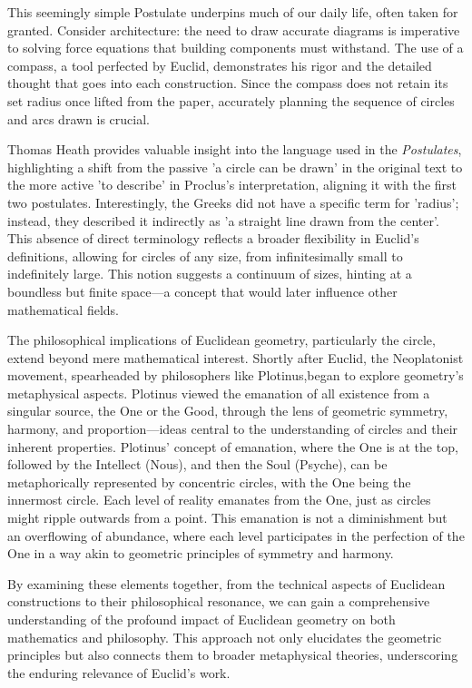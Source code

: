 This seemingly simple Postulate underpins much of our daily life, often taken for granted. Consider architecture: the need to draw accurate diagrams is imperative to solving force equations that building components must withstand. The use of a compass, a tool perfected by Euclid, demonstrates his rigor and the detailed thought that goes into each construction. Since the compass does not retain its set radius once lifted from the paper, accurately planning the sequence of circles and arcs drawn is crucial.

\clearpage

Thomas Heath provides valuable insight into the language used in the \textit{Postulates}, highlighting a shift from the passive 'a circle can be drawn' in the original text to the more active 'to describe' in Proclus's interpretation, aligning it with the first two postulates. Interestingly, the Greeks did not have a specific term for 'radius'; instead, they described it indirectly as 'a straight line drawn from the center'. This absence of direct terminology reflects a broader flexibility in Euclid's definitions, allowing for circles of any size, from infinitesimally small to indefinitely large. This notion suggests a continuum of sizes, hinting at a boundless but finite space—a concept that would later influence other mathematical fields.

The philosophical implications of Euclidean geometry, particularly the circle, extend beyond mere mathematical interest. Shortly after Euclid, the Neoplatonist movement, spearheaded by philosophers like Plotinus,began to explore geometry's metaphysical aspects. Plotinus viewed the emanation of all existence from a singular source, the One or the Good, through the lens of geometric symmetry, harmony, and proportion—ideas central to the understanding of circles and their inherent properties. Plotinus’ concept of emanation, where the One is at the top, followed by the Intellect (Nous), and then the Soul (Psyche), can be metaphorically represented by concentric circles, with the One being the innermost circle. Each level of reality emanates from the One, just as circles might ripple outwards from a point. This emanation is not a diminishment but an overflowing of abundance, where each level participates in the perfection of the One in a way akin to geometric principles of symmetry and harmony.

By examining these elements together, from the technical aspects of Euclidean constructions to their philosophical resonance, we can gain a comprehensive understanding of the profound impact of Euclidean geometry on both mathematics and philosophy. This approach not only elucidates the geometric principles but also connects them to broader metaphysical theories, underscoring the enduring relevance of Euclid's work.

\clearpage

